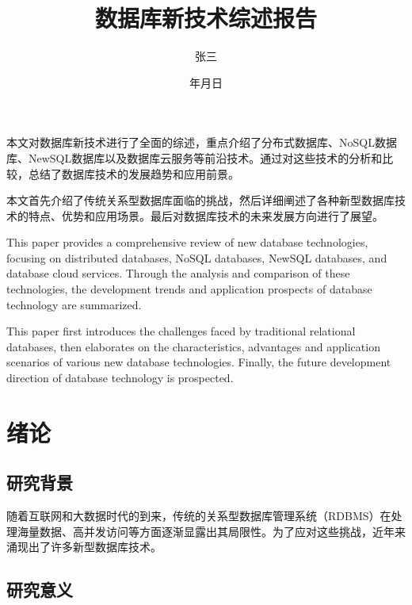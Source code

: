 \documentclass{report-uestc}
\title{数据库新技术综述报告}
\author{张三}
\date{\the\year 年\the\month 月\the\day 日}
\begin{document}
\makecover

\begin{chineseabstract}
本文对数据库新技术进行了全面的综述，重点介绍了分布式数据库、NoSQL数据库、NewSQL数据库以及数据库云服务等前沿技术。通过对这些技术的分析和比较，总结了数据库技术的发展趋势和应用前景。

本文首先介绍了传统关系型数据库面临的挑战，然后详细阐述了各种新型数据库技术的特点、优势和应用场景。最后对数据库技术的未来发展方向进行了展望。

\end{chineseabstract}

\begin{englishabstract}
This paper provides a comprehensive review of new database technologies, focusing on distributed databases, NoSQL databases, NewSQL databases, and database cloud services. Through the analysis and comparison of these technologies, the development trends and application prospects of database technology are summarized.

This paper first introduces the challenges faced by traditional relational databases, then elaborates on the characteristics, advantages and application scenarios of various new database technologies. Finally, the future development direction of database technology is prospected.

\end{englishabstract}

\reporttableofcontents

\reportcontent

\chapter{绪\hspace{6pt}论}

\section{研究背景}

随着互联网和大数据时代的到来，传统的关系型数据库管理系统（RDBMS）在处理海量数据、高并发访问等方面逐渐显露出其局限性。为了应对这些挑战，近年来涌现出了许多新型数据库技术。

\section{研究意义}
\end{document}
